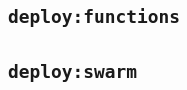 \appendix
\appendixpage

\section{}

\subsection{\texttt{deploy:functions}}


\newpage
\subsection{\texttt{deploy:swarm}}

